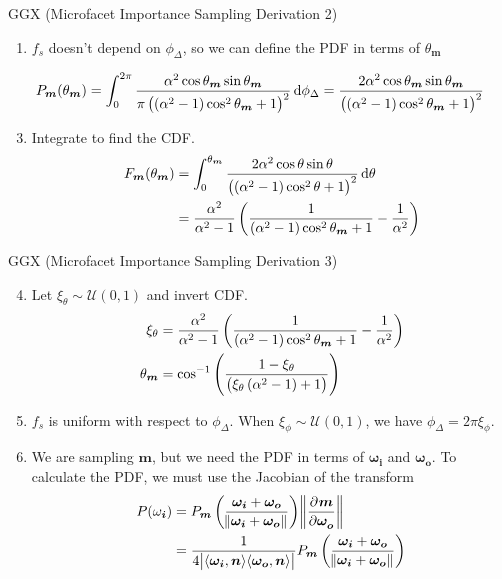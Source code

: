 \documentclass[10pt]{beamer}
\DeclarePairedDelimiter\ip{\langle }{\rangle}
\begin{document}
\begin{frame}{GGX (Microfacet Importance Sampling Derivation 2)}
  \begin{enumerate}
  \item \(f_s\) doesn't depend on \(\phi_\Delta\), so we can define the PDF in terms of \(\theta_{\bm m}\)
  \end{enumerate}
  \[P_{\bm m}(\theta_{\bm m}) = \int_0^{2\pi}\frac{\alpha^2 \cos\theta_{\bm m} \sin\theta_{\bm m}}{\pi\del{\del{\alpha^2 - 1}\cos^2 \theta_{\bm m} + 1}^2}\dif\phi_\Delta = \frac{2\alpha^2 \cos\theta_{\bm m} \sin\theta_{\bm m}}{\del{\del{\alpha^2 - 1}\cos^2 \theta_{\bm m} + 1}^2}\]
  \begin{enumerate}
    \setcounter{enumi}{2}
  \item Integrate to find the CDF.
    \begin{align*}
      F_{\bm m}(\theta_{\bm m}) &= \int_0^{\theta_{\bm m}} \frac{2\alpha^2 \cos\theta \sin\theta}{\del{\del{\alpha^2 - 1}\cos^2 \theta + 1}^2}\dif\theta\\
      &= \frac{\alpha^2}{\alpha^2 - 1}  \del{\frac{1}{\del{\alpha^2 - 1}\cos^2\theta_{\bm m} + 1} - \frac{1}{\alpha^2}}
    \end{align*}
  \end{enumerate}
\end{frame}

\begin{frame}{GGX (Microfacet Importance Sampling Derivation 3)}
  \begin{enumerate}
    \setcounter{enumi}{3}
  \item Let \(\xi_\theta \sim \mathcal{U}(0, 1)\) and invert CDF.
    \begin{align*}
      \xi_\theta &= \frac{\alpha^2}{\alpha^2 - 1}  \del{\frac{1}{\del{\alpha^2 - 1}\cos^2\theta_{\bm m} + 1} - \frac{1}{\alpha^2}}\\
      \theta_{\bm m}&= \cos^{-1}\del{\frac{1- \xi_\theta}{\del{\xi_\theta\del{\alpha^2 - 1} + 1}}}
    \end{align*}
  \item \(f_s\) is uniform with respect to \(\phi_\Delta\). When \(\xi_\phi \sim \mathcal{U}(0, 1)\), we have \(\phi_\Delta = 2\pi\xi_\phi\).
  \item We are sampling \(\bm m\), but we need the PDF in terms of \(\bm{\omega_i}\) and \(\bm{\omega_o}\).
    To calculate the PDF, we must use the Jacobian of the transform
    \begin{align*}
      P(\omega_{\bm i}) &= P_{\bm m}\del{\frac{\bm{\omega_i} + \bm{\omega_o}}{\norm{\bm{\omega_i} + \bm{\omega_o}}} } \norm{\dpd{\bm m}{\bm{\omega_o}}}\\
                        &= \frac{1}{4\abs{\ip{\bm{\omega_i}, \bm n}\ip{\bm{\omega_o}, \bm n}}}P_{\bm m}\del{\frac{\bm{\omega_i} + \bm{\omega_o}}{\norm{\bm{\omega_i} + \bm{\omega_o}}}}
    \end{align*}
  \end{enumerate}
\end{frame}
\end{document}

